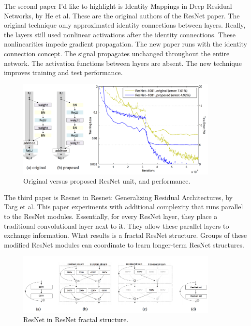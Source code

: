 \documentclass[12pt]{article}
\numberwithin{equation}{section}
\numberwithin{table}{section}
\numberwithin{figure}{section}
\begin{document}
The second paper I’d like to highlight is Identity Mappings in Deep Residual Networks, by He et al. These are the original authors of the ResNet paper. The original technique only approximated identity connections between layers. Really, the layers still used nonlinear activations after the identity connections. These nonlinearities impede gradient propagation. The new paper runs with the identity connection concept. The signal propagates unchanged throughout the entire network. The activation functions between layers are absent. The new technique improves training and test performance.


\begin{figure} \centering
  \includegraphics[width=0.9\textwidth]{image1.png}
  \caption{Original versus proposed ResNet unit, and performance.}
  \label{figsolplot}
\end{figure}

The third paper is Resnet in Resnet: Generalizing Residual Architectures, by Targ et al. This paper experiments with additional complexity that runs parallel to the ResNet modules. Essentially, for every ResNet layer, they place a traditional convolutional layer next to it. They allow these parallel layers to exchange information. What results is a fractal ResNet structure. Groups of these modified ResNet modules can coordinate to learn longer-term ResNet structures.


\begin{figure} \centering
	\includegraphics[width=0.9\textwidth]{image2.png}
	\caption{ResNet in ResNet fractal structure.}
	\label{figure2}
\end{figure}
\end{document}
